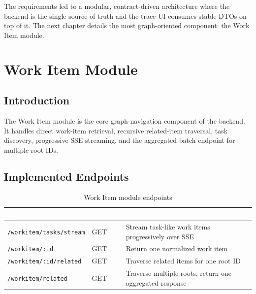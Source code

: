 \documentclass[12pt,a4paper]{report}
\newcommand{\code}[1]{\texttt{\small\color{codered}#1}}
\begin{document}
The requirements led to a modular, contract-driven architecture where the backend
is the single source of truth and the trace UI consumes stable DTOs on top of it.
The next chapter details the most graph-oriented component: the Work Item module.

\chapter{Work Item Module}

\section{Introduction}

The Work Item module is the core graph-navigation component of the backend. It
handles direct work-item retrieval, recursive related-item traversal, task
discovery, progressive SSE streaming, and the aggregated batch endpoint for
multiple root IDs.

\section{Implemented Endpoints}

\begin{table}[H]
\centering
\caption{Work Item module endpoints}
\label{tab:work-item-endpoints}
\begin{tabularx}{\textwidth}{|p{5cm}|p{1.8cm}|X|}
\hline
\rowcolor{primary}
  \textcolor{white}{\textbf{Endpoint}} &
  \textcolor{white}{\textbf{Method}} &
  \textcolor{white}{\textbf{Purpose}} \\
\hline
\code{/workitem/tasks/stream} & GET & Stream task-like work items progressively over SSE \\
\code{/workitem/:id}          & GET & Return one normalized work item \\
\code{/workitem/:id/related}  & GET & Traverse related items for one root ID \\
\code{/workitem/related}      & GET & Traverse multiple roots, return one aggregated response \\
\hline
\end{tabularx}
\end{table}

\end{document}
